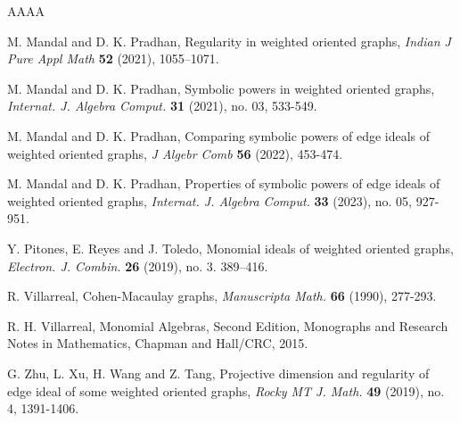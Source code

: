 \documentclass[11pt,reqno]{amsart}
\theoremstyle{definition}
\begin{document}
\begin{thebibliography}{AAAA}
{   
   {M. Mandal and D. K. Pradhan}, {Regularity in weighted oriented graphs}, \textit{Indian J Pure Appl Math} {\bf52}   (2021), 1055–1071.
   
   {M. Mandal and D. K. Pradhan}, { Symbolic powers in weighted oriented graphs}, \textit{Internat. J. Algebra
   	Comput.} {\bf31} (2021), no. 03,  533-549.
   
 
   
   
 {M. Mandal and D. K. Pradhan},  { Comparing symbolic powers of edge ideals of weighted oriented graphs},  \textit{J Algebr Comb} {\bf56} (2022), 453-474.		
   
  {M. Mandal and D. K. Pradhan},  { Properties of symbolic powers of edge ideals of weighted oriented graphs}, \textit{Internat. J. Algebra
   	Comput.} {\bf33} (2023), no. 05, 927-951. 
   
 

	
	
{Y. Pitones, E. Reyes and J. Toledo}, { Monomial ideals of weighted oriented graphs}, \textit{Electron. J. Combin.} {\bf26} (2019), no. 3.
389–416.
	
	


 R. Villarreal, { Cohen-Macaulay graphs}, {\em Manuscripta Math.} \textbf{66} (1990), 277-293.


 R. H. Villarreal, { Monomial Algebras}, Second Edition, Monographs and Research Notes in Mathematics, Chapman and Hall/CRC, 2015.



	
{G. Zhu, L. Xu, H. Wang and Z. Tang}, { Projective dimension and regularity of edge ideal of some weighted oriented graphs}, \textit{Rocky MT J. Math.} {\bf49} (2019), no. 4, 1391-1406.


}
\end{thebibliography}
\end{document}
